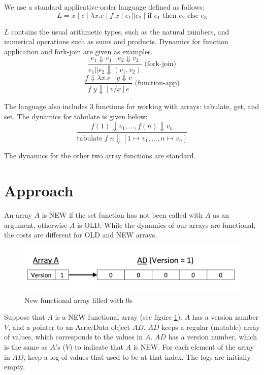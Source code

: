 \documentclass[preprint]{sigplanconf}
\begin{document}
We use a standard applicative-order language defined as follows:
$$L = x \; | \; c  \; | \; \lambda x.e \; | \; f \; x \; | \; e_1 || e_2 \; | \; \text{if } e_1 \text{ then } e_2 \text{ else } e_3$$

$L$ contains the usual arithmetic types, such as the natural numbers, and numerical operations such as sums and products. Dynamics for function application and fork-join are given as examples.
$$\frac{e_1 \Downarrow v_1 \;\;\; e_2 \Downarrow v_2}{e_1 || e_2 \Downarrow (v_1, v_2)} \text{ (fork-join)}$$
$$\frac{f \Downarrow \lambda x . e \;\;\; y \Downarrow v}{f \; y \Downarrow [v/x]e} \text{ (function-app)}$$

The language also includes 3 functions for working with arrays: tabulate, get, and set. The dynamics for tabulate is given below:
$$\frac{f(1) \Downarrow v_1, ..., f(n) \Downarrow v_n}{\text{tabulate} \; f \; n \Downarrow [1 \mapsto v_1, ..., n \mapsto v_n]}$$

The dynamics for the other two array functions are standard.

\section{Approach}

An array $A$ is NEW if the set function has not been called with $A$ as an argument, otherwise $A$ is OLD. While the dynamics of our arrays are functional, the costs are different for OLD and NEW arrays. 

\begin{figure}[!ht]
\centering
\includegraphics[scale=0.3]{new_array_A}
\nocaptionrule \caption{New functional array filled with 0s}
\label{fig:new_array_A}
\end{figure}

Suppose that $A$ is a NEW functional array  (see figure \ref{fig:new_array_A}). $A$ has a version number $V$, and a pointer to an ArrayData object $AD$. $AD$ keeps a regular (mutable) array of values, which corresponds to the values in $A$. $AD$ has a version number, which is the same as $A'$s ($V$) to indicate that $A$ is NEW. For each element of the array in $AD$, keep a log of values that used to be at that index. The logs are initially empty.
\end{document}
